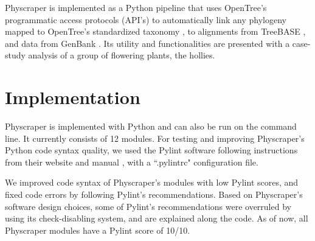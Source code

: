 \documentclass{bmcart}
\begin{document}
Physcraper is implemented as a Python pipeline that uses OpenTree's programmatic access
protocols (API's) to automatically
link any phylogeny mapped to OpenTree's standardized taxonomy \cite{mctavish2015phylesystem},
to alignments
from TreeBASE \cite{sanderson1994treebase}, and data from GenBank \cite{benson2000genbank}.
Its utility and functionalities are presented with a case-study analysis of a
group of flowering plants, the hollies.


\section*{Implementation}

Physcraper is implemented with Python and can also be run on the command line.
It currently consists of 12 modules.
For testing and improving Physcraper's Python code syntax quality, we
used the Pylint software following instructions from their website \cite{pylintWeb}
 and manual \cite{pylintManual}, with a ``.pylintrc" configuration file.

We improved code syntax of Physcraper's modules with low Pylint scores, and fixed code errors by
following Pylint's recommendations.
Based on Physcraper's software design choices, some of Pylint's recommendations were overruled
by using its check-disabling system, and are explained along the code.
As of now, all Physcraper modules have a Pylint score of 10/10.

\end{document}
